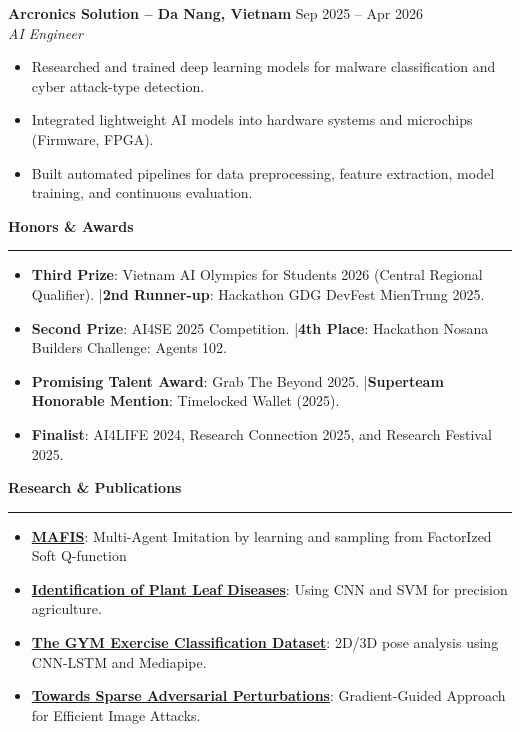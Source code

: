 \documentclass[10pt,a4paper]{article}
\newcommand{\sectionhr}[1]{%
  \vspace{0.4em}\noindent\textbf{\large #1}\par
  \vspace{0.2em}\hrule\vspace{0.4em}
}
\begin{document}
\vspace{0.3em}
\textbf{Arcronics Solution – Da Nang, Vietnam} \hfill Sep 2025 -- Apr 2026 \\
\emph{AI Engineer}
\begin{itemize}
\item Researched and trained deep learning models for malware classification and cyber attack-type detection.
\item Integrated lightweight AI models into hardware systems and microchips (Firmware, FPGA).
\item Built automated pipelines for data preprocessing, feature extraction, model training, and continuous evaluation.
\end{itemize}

\sectionhr{Honors \& Awards}
\begin{itemize}[leftmargin=0pt, label=]
\item \textbf{Third Prize}: Vietnam AI Olympics for Students 2026 (Central Regional Qualifier). \quad|\quad \textbf{2nd Runner-up}: Hackathon GDG DevFest MienTrung 2025.
\item \textbf{Second Prize}: AI4SE 2025 Competition. \quad|\quad \textbf{4th Place}: Hackathon Nosana Builders Challenge: Agents 102.
\item \textbf{Promising Talent Award}: Grab The Beyond 2025. \quad|\quad \textbf{Superteam Honorable Mention}: Timelocked Wallet (2025).
\item \textbf{Finalist}: AI4LIFE 2024, Research Connection 2025, and Research Festival 2025.
\end{itemize}

\sectionhr{Research \& Publications}
\begin{itemize}[leftmargin=0pt, label=]
\item \href{https://drive.google.com/file/d/1f-_lmgSBEQNiokMz5ruVxllKGePAKLLs/view?usp=drive_link}{\textbf{MAFIS}}: Multi-Agent Imitation by learning and sampling from FactorIzed Soft Q-function
\item \href{https://drive.google.com/file/d/1C1UmtYmYN1q72dGiZ-QnILFhtghNS1Vg/view?usp=drive_link}{\textbf{Identification of Plant Leaf Diseases}}: Using CNN and SVM for precision agriculture.
\item \href{https://drive.google.com/file/d/1L5Vi10YiWKZArKmDK_A7PQRQ3pDMiLGO/view?usp=drive_link}{\textbf{The GYM Exercise Classification Dataset}}: 2D/3D pose analysis using CNN-LSTM and Mediapipe.
\item \href{https://drive.google.com/file/d/1DitwY3fDwt5S5XOb4LiS2O0MDBZtA2lA/view?usp=drive_link}{\textbf{Towards Sparse Adversarial Perturbations}}: Gradient-Guided Approach for Efficient Image Attacks.
\end{itemize}
\end{document}
